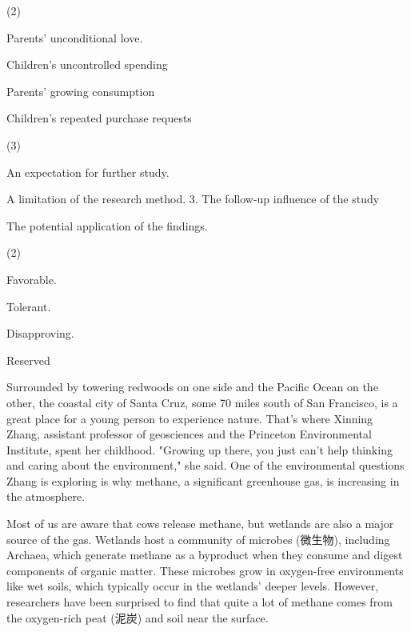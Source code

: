 \documentclass{英语试卷}
\begin{document}
\begin{choices}(2)
  \item Parents' unconditional love.
  \item Children's uncontrolled spending
  \item Parents' growing consumption
  \item Children's repeated purchase requests
\end{choices}
\begin{choices}(3)
  \item An expectation for further study.
  \item A limitation of the research method. 3. The follow-up influence of the study
  \item The potential application of the findings.
\end{choices}
\begin{choices}(2)
  \item Favorable.
  \item Tolerant.
  \item Disapproving.
  \item Reserved
\end{choices}
\par Surrounded by towering redwoods on one side and the Pacific Ocean on the other, the coastal city of Santa Cruz, some 70 miles south of San Francisco, is a great place for a young person to experience nature. That's where Xinning Zhang, assistant professor of geosciences and the Princeton Environmental Institute, spent her childhood. "Growing up there, you just can't help thinking and caring about the environment," she said. One of the environmental questions Zhang is exploring is why methane, a significant greenhouse gas, is increasing in the atmosphere.\par
\par Most of us are aware that cows release methane, but wetlands are also a major source of the gas. Wetlands host a community of microbes (微生物), including Archaea, which generate methane as a byproduct when they consume and digest components of organic matter. These microbes grow in oxygen-free environments like wet soils, which typically occur in the wetlands' deeper levels. However, researchers have been surprised to find that quite a lot of methane comes from the oxygen-rich peat (泥炭) and soil near the surface.\par
\end{document}
